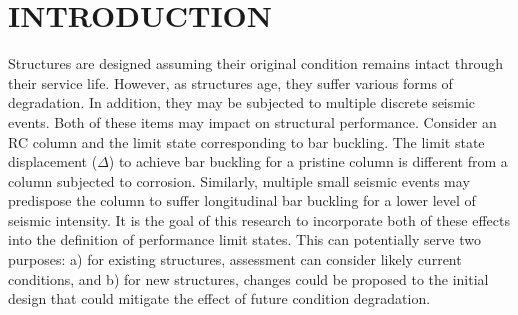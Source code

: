 \chapter{INTRODUCTION}
\label{chap-one}

Structures are designed assuming their original condition remains intact through their service life. However, as structures age, they suffer various forms of degradation. In addition, they may be subjected to multiple discrete seismic events. Both of these items may impact on structural performance. Consider an RC column and the limit state corresponding to bar buckling. The limit state displacement ($\Delta$) to achieve bar buckling for a pristine column is different from a column subjected to corrosion. Similarly, multiple small seismic events may predispose the column to suffer longitudinal bar buckling for a lower level of seismic intensity. It is the goal of this research to incorporate both of these effects into the definition of performance limit states. This can potentially serve two purposes: a) for existing structures, assessment can consider likely current conditions, and b) for new structures, changes could be proposed to the initial design that could mitigate the effect of future condition degradation.

